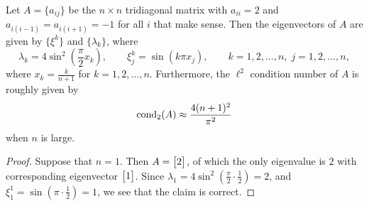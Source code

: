 \documentclass{homework}
\begin{document}
	\question Let $A = \{a_{ij}\}$ be the $n\times n$ tridiagonal matrix with $a_{ii} = 2$ and $a_{i(i-1)} = a_{i(i+1)} = -1$ for all $i$ that make sense. Then the eigenvectors of $A$ are given by $\{\xi^k\}$ and $\{\lambda_k\}$, where
	\begin{equation*}
		\lambda_k = 4\sin^2\left(\frac{\pi}{2}x_k\right), \qquad \xi^k_j = \sin(k\pi x_j), \qquad k =1,2,\dots,n,\; j =1,2,\dots, n,
	\end{equation*}
	where $x_k = \frac{k}{n+1}$ for $k=1,2,\dots,n$. Furthermore, the $\ell^2$ condition number of $A$ is roughly given by
	\begin{equation*}
		\operatorname{cond}_2(A) \approx \frac{4(n+1)^2}{\pi^2}
	\end{equation*}
	when $n$ is large.
	\begin{proof}
		Suppose that $n = 1$. Then $A = \left[\begin{matrix}2\end{matrix}\right]$, of which the only eigenvalue is $2$ with corresponding eigenvector $\left[\begin{matrix}1\end{matrix}\right]$. Since $\lambda_1 = 4\sin^2\left(\frac{\pi}{2}\cdot\frac{1}{2}\right) = 2$, and $\xi^1_1 = \sin\left(\pi\cdot\frac{1}{2}\right) = 1$, we see that the claim is correct.
		

\end{proof}
\end{document}
